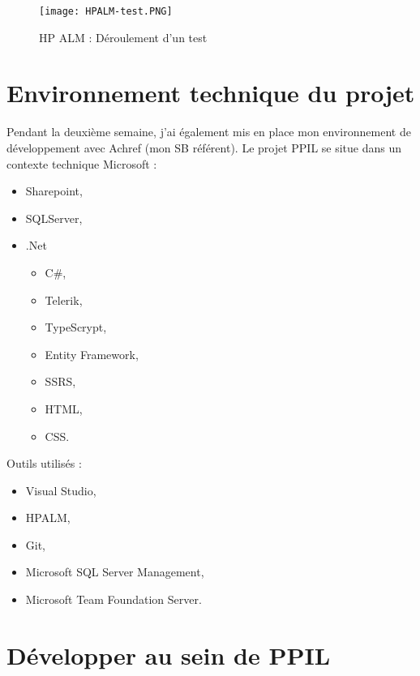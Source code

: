 \begin{figure}[h]
\centering
\texttt{[image: HPALM-test.PNG]}\\[1cm]
\caption{HP ALM : Déroulement d'un test}
\end{figure}

\section{Environnement technique du projet}

Pendant la deuxième semaine, j'ai également mis en place mon environnement de développement avec Achref (mon SB référent). Le projet PPIL se situe dans un contexte technique Microsoft : 

\begin{itemize}
    \item Sharepoint, 
    \item SQLServer, 
    \item .Net
    \begin{itemize}
        \item C\#, 
        \item Telerik, 
        \item TypeScrypt, 
        \item Entity Framework, 
        \item SSRS, 
        \item HTML, 
        \item CSS.
    \end{itemize}
\end{itemize}

Outils utilisés :
\begin{itemize}
    \item Visual Studio,
    \item HPALM,
    \item Git,
    \item Microsoft SQL Server Management,
    \item Microsoft Team Foundation Server.
\end{itemize}

\section{Développer au sein de PPIL}

